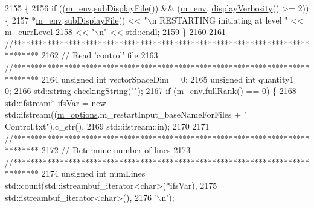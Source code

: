\begin{DoxyCode}
2155 \{
2156   \textcolor{keywordflow}{if} ((\hyperlink{class_q_u_e_s_o_1_1_m_l_sampling_a13f1ca4fe9f94822fe572a743eaced1d}{m\_env}.\hyperlink{class_q_u_e_s_o_1_1_base_environment_a8a0064746ae8dddfece4229b9ad374d6}{subDisplayFile}()) && (\hyperlink{class_q_u_e_s_o_1_1_m_l_sampling_a13f1ca4fe9f94822fe572a743eaced1d}{m\_env}.
      \hyperlink{class_q_u_e_s_o_1_1_base_environment_a1fe5f244fc0316a0ab3e37463f108b96}{displayVerbosity}() >= 2)) \{
2157     *\hyperlink{class_q_u_e_s_o_1_1_m_l_sampling_a13f1ca4fe9f94822fe572a743eaced1d}{m\_env}.\hyperlink{class_q_u_e_s_o_1_1_base_environment_a8a0064746ae8dddfece4229b9ad374d6}{subDisplayFile}() << \textcolor{stringliteral}{"\(\backslash\)n RESTARTING initiating at level "} << 
      \hyperlink{class_q_u_e_s_o_1_1_m_l_sampling_af9416874c856e50f3b35270e801f17e4}{m\_currLevel}
2158                             << \textcolor{stringliteral}{"\(\backslash\)n"} << std::endl;
2159   \}
2160 
2161   \textcolor{comment}{//******************************************************************************}
2162   \textcolor{comment}{// Read 'control' file}
2163   \textcolor{comment}{//******************************************************************************}
2164   \textcolor{keywordtype}{unsigned} \textcolor{keywordtype}{int} vectorSpaceDim  = 0;
2165   \textcolor{keywordtype}{unsigned} \textcolor{keywordtype}{int} quantity1       = 0;
2166   std::string  checkingString(\textcolor{stringliteral}{""});
2167   \textcolor{keywordflow}{if} (\hyperlink{class_q_u_e_s_o_1_1_m_l_sampling_a13f1ca4fe9f94822fe572a743eaced1d}{m\_env}.\hyperlink{class_q_u_e_s_o_1_1_base_environment_a84a239e42ae443cf71db6e03e8159620}{fullRank}() == 0) \{
2168     std::ifstream* ifsVar = \textcolor{keyword}{new} std::ifstream((\hyperlink{class_q_u_e_s_o_1_1_m_l_sampling_af8504cc57ec72b3c52833826b2bfff8e}{m\_options}.m\_restartInput\_baseNameForFiles + \textcolor{stringliteral}{"
      Control.txt"}).c\_str(),
2169                                               std::ifstream::in);
2170 
2171     \textcolor{comment}{//******************************************************************************}
2172     \textcolor{comment}{// Determine number of lines}
2173     \textcolor{comment}{//******************************************************************************}
2174     \textcolor{keywordtype}{unsigned} \textcolor{keywordtype}{int} numLines = std::count(std::istreambuf\_iterator<char>(*ifsVar),
2175                                        std::istreambuf\_iterator<char>(),
2176                                        \textcolor{charliteral}{'\(\backslash\)n'});

\end{DoxyCode}
